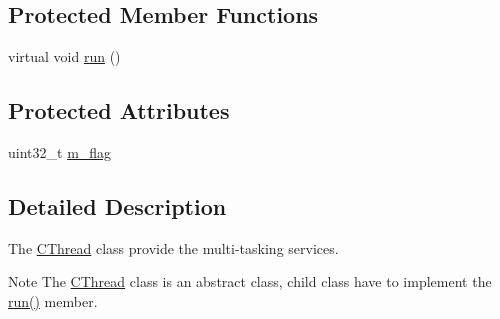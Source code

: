 \subsection*{Protected Member Functions}
\begin{DoxyCompactItemize}
\item 
virtual void \hyperlink{class_c_thread_a071c3d3b3c19a7bd6a01aca073a9b4d7}{run} ()
\end{DoxyCompactItemize}
\subsection*{Protected Attributes}
\begin{DoxyCompactItemize}
\item 
uint32\-\_\-t \hyperlink{class_c_thread_a2723c18f3f7659cdd93610fd1654d564}{m\-\_\-flag}
\end{DoxyCompactItemize}


\subsection{Detailed Description}
The \hyperlink{class_c_thread}{C\-Thread} class provide the multi-\/tasking services. \begin{DoxyNote}{Note}
The \hyperlink{class_c_thread}{C\-Thread} class is an abstract class, child class have to implement the \hyperlink{class_c_thread_a071c3d3b3c19a7bd6a01aca073a9b4d7}{run()} member. 
\end{DoxyNote}


